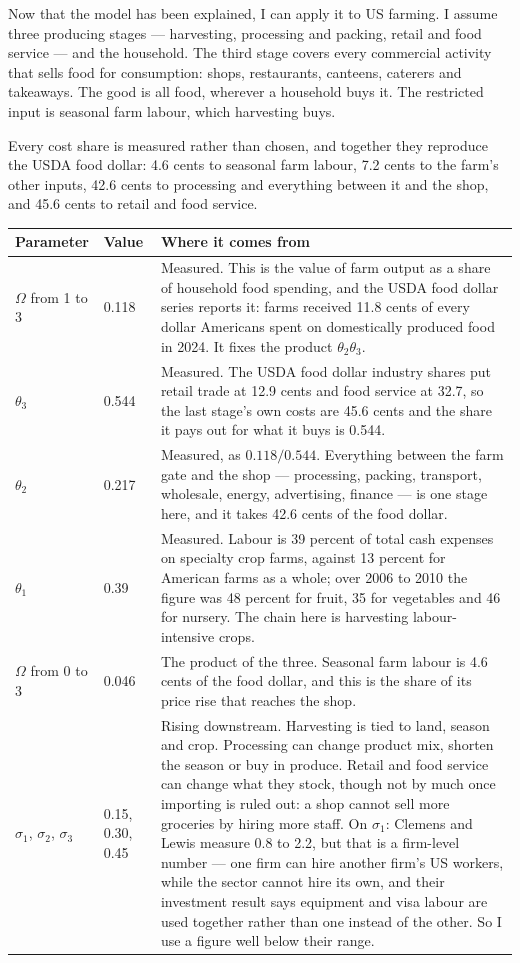 \documentclass[11pt,a4paper]{article}
\begin{document}
Now that the model has been explained, I can apply it to US farming. I assume three producing stages --- harvesting, processing and packing, retail and food service --- and the household. The third stage covers every commercial activity that sells food for consumption: shops, restaurants, canteens, caterers and takeaways. The good is all food, wherever a household buys it. The restricted input is seasonal farm labour, which harvesting buys.

Every cost share is measured rather than chosen, and together they reproduce the USDA food dollar: 4.6 cents to seasonal farm labour, 7.2 cents to the farm's other inputs, 42.6 cents to processing and everything between it and the shop, and 45.6 cents to retail and food service.

\begin{table}[htbp]
\centering
\small
\begin{tabularx}{\textwidth}{l l X}
\toprule
\textbf{Parameter} & \textbf{Value} & \textbf{Where it comes from} \\
\midrule
$\Omega$ from 1 to 3 & 0.118 & Measured. This is the value of farm output as a share of household food spending, and the USDA food dollar series reports it: farms received 11.8 cents of every dollar Americans spent on domestically produced food in 2024. It fixes the product $\theta_2 \theta_3$. \\
$\theta_3$ & 0.544 & Measured. The USDA food dollar industry shares put retail trade at 12.9 cents and food service at 32.7, so the last stage's own costs are 45.6 cents and the share it pays out for what it buys is 0.544. \\
$\theta_2$ & 0.217 & Measured, as $0.118 / 0.544$. Everything between the farm gate and the shop --- processing, packing, transport, wholesale, energy, advertising, finance --- is one stage here, and it takes 42.6 cents of the food dollar. \\
$\theta_1$ & 0.39 & Measured. Labour is 39 percent of total cash expenses on specialty crop farms, against 13 percent for American farms as a whole; over 2006 to 2010 the figure was 48 percent for fruit, 35 for vegetables and 46 for nursery. The chain here is harvesting labour-intensive crops. \\
$\Omega$ from 0 to 3 & 0.046 & The product of the three. Seasonal farm labour is 4.6 cents of the food dollar, and this is the share of its price rise that reaches the shop. \\
$\sigma_1$, $\sigma_2$, $\sigma_3$ & 0.15, 0.30, 0.45 & Rising downstream. Harvesting is tied to land, season and crop. Processing can change product mix, shorten the season or buy in produce. Retail and food service can change what they stock, though not by much once importing is ruled out: a shop cannot sell more groceries by hiring more staff. On $\sigma_1$: Clemens and Lewis measure 0.8 to 2.2, but that is a firm-level number --- one firm can hire another firm's US workers, while the sector cannot hire its own, and their investment result says equipment and visa labour are used together rather than one instead of the other. So I use a figure well below their range. \\

\end{tabularx}
\end{table}
\end{document}
